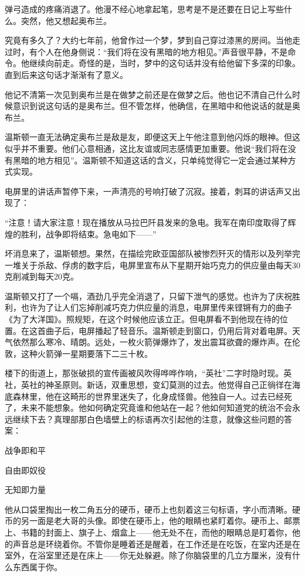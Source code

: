 弹弓造成的疼痛消退了。他漫不经心地拿起笔，思考是不是还要在日记上写些什么。突然，他又想起奥布兰。

究竟有多久了？大约七年前，他曾作过一个梦，梦到自己穿过漆黑的房间。当他走过时，有个人在他身侧说：``我们将在没有黑暗的地方相见。''声音很平静，不是命令。他继续向前走。奇怪的是，当时，梦中的这句话并没有给他留下多深的印象。直到后来这句话才渐渐有了意义。

他记不清第一次见到奥布兰是在做梦之前还是在做梦之后。他也记不清自己什么时候意识到说这句话的是奥布兰。但不管怎样，他确信，在黑暗中和他说话的就是奥布兰。

温斯顿一直无法确定奥布兰是敌是友，即便这天上午他注意到他闪烁的眼神。但这似乎并不重要。他们心意相通，这比友谊或同志感情更加重要。他说``我们将在没有黑暗的地方相见''。温斯顿不知道这话的含义，只单纯觉得它一定会通过某种方式实现。

电屏里的讲话声暂停下来，一声清亮的号响打破了沉寂。接着，刺耳的讲话声又出现了：

``注意！请大家注意！现在播放从马拉巴阡县发来的急电。我军在南印度取得了辉煌的胜利，战争即将结束。急电如下------''

坏消息来了，温斯顿想。果然，在描绘完欧亚国部队被惨烈歼灭的情形以及列举完一堆关于杀敌、俘虏的数字后，电屏里宣布从下星期开始巧克力的供应量由每天30克削减到每天20克。

温斯顿又打了一个嗝，酒劲几乎完全消退了，只留下泄气的感觉。也许为了庆祝胜利，也许为了让人们忘掉削减巧克力供应量的消息，电屏里传来铿锵有力的曲子《为了大洋国》。照规矩，在这个时候他应该立正。但电屏看不到他现在待的位置。在这首曲子后，电屏播起了轻音乐。温斯顿走到窗口，仍用后背对着电屏。天气依然那么寒冷、晴朗。远处，一枚火箭弹爆炸了，发出震耳欲聋的爆炸声。在伦敦，这种火箭弹一星期要落下二三十枚。

楼下的街道上，那张破损的宣传画被风吹得哗哗作响，``英社''二字时隐时现。英社，英社的神圣原则。新话，双重思想，变幻莫测的过去。他觉得自己正徜徉在海底森林里，他在这畸形的世界里迷失了，化身成怪兽。他独自一人。过去已经死了，未来不能想象。他如何确定究竟谁和他站在一起？他如何知道党的统治不会永远继续下去？真理部那白色墙壁上的标语再次引起他的注意，就像这些问题的答案：

战争即和平

自由即奴役

无知即力量

他从口袋里掏出一枚二角五分的硬币，硬币上也刻着这三句标语，字小而清晰。硬币的另一面是老大哥的头像。即使在硬币上，他的眼睛也紧盯着你。硬币上、邮票上、书籍的封面上、旗子上、烟盒上------他无处不在，而他的眼睛总是盯着你，他的声音总是环绕着你。不管你是睡着还是醒着，在工作还是在吃饭，在室内还是在室外，在浴室里还是在床上------你无处躲避。除了你脑袋里的几立方厘米，没有什么东西属于你。

